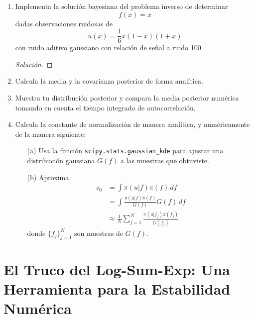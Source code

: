 \documentclass[12pt,spanish,mexico]{article}
\numberwithin{equation}{section}
\theoremstyle{definition}
\theoremstyle{remark}
\newenvironment{solution}{\begin{proof}[Solución]}{\end{proof}}
\begin{document}
\begin{enumerate}
\begin{solution}
Entonces, toma la forma
\[
x_i \mid x_{\partial i}
\sim \mathcal{N}\left(\bar{x}_{\partial i}, \left(\frac{\delta n_i}{h^2}\right)^{-1}\right),
\]
donde
\[
\bar{x}_{\partial i} = \frac{1}{n_i} \sum_{j \in \partial i} x_j
\]
es el promedio de los valores vecinos, y la función de densidad conjunta está dada por
\[
\left[Q \right]_{ij} = \frac{\delta}{h^2}
\begin{cases}
n_i, & i = j, \\
-1, & j \in \partial i, \\
0, & \text{en otro caso}.
\end{cases}
\]
\end{solution}
\item Implementa la solución bayesiana del problema inverso de determinar
\[
f(x) = x
\]
dadas observaciones ruidosas de
\[
u(x) = \frac{1}{6}x(1-x)(1+x)
\]
con ruido aditivo gaussiano con relación de señal a ruido 100.
\begin{solution}

\end{solution}
\item Calcula la media y la covarianza posterior de forma analítica.

\item Muestra tu distribución posterior y compara la media posterior numérica tomando en cuenta el tiempo integrado de autocorrelación.

\item Calcula la constante de normalización de manera analítica, y numéricamente de la manera siguiente:

\begin{enumerate}
\item[(a)] Usa la función \texttt{scipy.stats.gaussian\_kde} para ajustar una distribución gaussiana $G(f)$ a las muestras que obtuviste.

\item[(b)] Aproxima
\[
\begin{aligned}
z_0 &= \int \pi(u|f)\pi(f)\,df \\
&= \int \frac{\pi(u|f)\pi(f)}{G(f)} G(f)\,df \\
&\approx \frac{1}{N} \sum_{j=1}^{N} \frac{\pi(u|f_j)\pi(f_j)}{G(f_j)}
\end{aligned}
\]
donde $\{f_j\}_{j=1}^N$ son muestras de $G(f)$.
\end{enumerate}
\end{enumerate}

\section*{El Truco del Log-Sum-Exp: Una Herramienta para la Estabilidad Numérica}
\end{document}
